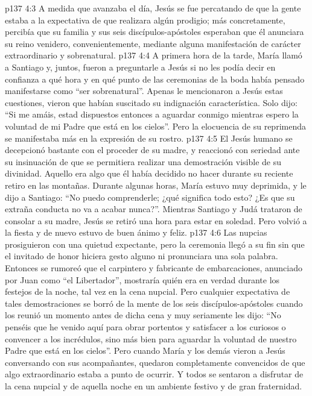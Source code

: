 \vs p137 4:3 A medida que avanzaba el día, Jesús se fue percatando de que la gente estaba a la expectativa de que realizara algún prodigio; más concretamente, percibía que su familia y sus seis discípulos\hyp{}apóstoles esperaban que él anunciara su reino venidero, convenientemente, mediante alguna manifestación de carácter extraordinario y sobrenatural.
\vs p137 4:4 A primera hora de la tarde, María llamó a Santiago y, juntos, fueron a preguntarle a Jesús si no les podía decir en confianza a qué hora y en qué punto de las ceremonias de la boda había pensado manifestarse como “ser sobrenatural”. Apenas le mencionaron a Jesús estas cuestiones, vieron que habían suscitado su indignación característica. Solo dijo: “Si me amáis, estad dispuestos entonces a aguardar conmigo mientras espero la voluntad de mi Padre que está en los cielos”. Pero la elocuencia de su reprimenda se manifestaba más en la expresión de su rostro.
\vs p137 4:5 El Jesús humano se decepcionó bastante con el proceder de su madre, y reaccionó con seriedad ante su insinuación de que se permitiera realizar una demostración visible de su divinidad. Aquello era algo que él había decidido no hacer durante su reciente retiro en las montañas. Durante algunas horas, María estuvo muy deprimida, y le dijo a Santiago: “No puedo comprenderle; ¿qué significa todo esto? ¿Es que su extraña conducta no va a acabar nunca?”. Mientras Santiago y Judá trataron de consolar a su madre, Jesús se retiró una hora para estar en soledad. Pero volvió a la fiesta y de nuevo estuvo de buen ánimo y feliz.
\vs p137 4:6 \pc Las nupcias prosiguieron con una quietud expectante, pero la ceremonia llegó a su fin sin que el invitado de honor hiciera gesto alguno ni pronunciara una sola palabra. Entonces se rumoreó que el carpintero y fabricante de embarcaciones, anunciado por Juan como “el Libertador”, mostraría quién era en verdad durante los festejos de la noche, tal vez en la cena nupcial. Pero cualquier expectativa de tales demostraciones se borró de la mente de los seis discípulos\hyp{}apóstoles cuando los reunió un momento antes de dicha cena y muy seriamente les dijo: “No penséis que he venido aquí para obrar portentos y satisfacer a los curiosos o convencer a los incrédulos, sino más bien para aguardar la voluntad de nuestro Padre que está en los cielos”. Pero cuando María y los demás vieron a Jesús conversando con sus acompañantes, quedaron completamente convencidos de que algo extraordinario estaba a punto de ocurrir. Y todos se sentaron a disfrutar de la cena nupcial y de aquella noche en un ambiente festivo y de gran fraternidad.
